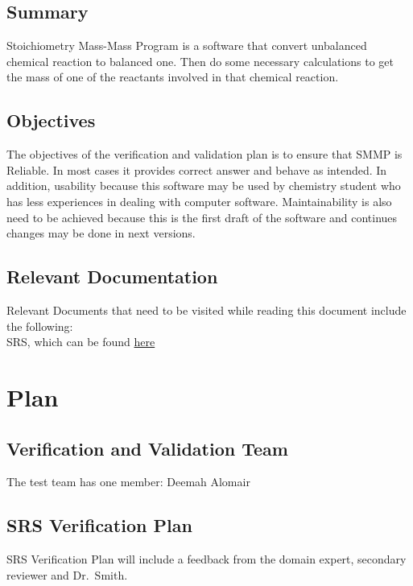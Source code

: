 \documentclass[12pt, titlepage]{article}
\begin{document}
\subsection{Summary}

Stoichiometry Mass-Mass Program is a software that convert unbalanced chemical
reaction to balanced one. Then do some necessary calculations to get the mass of
one of the reactants involved in that chemical reaction.

\subsection{Objectives}

The objectives of the verification and validation plan is to ensure that SMMP is
Reliable. In most cases it provides correct answer and behave as intended. In
addition, usability because this software may be used by chemistry student who
has less experiences in dealing with computer software. Maintainability is also
need to be achieved because this is the first draft of the software and
continues changes may be done in next versions.

\subsection{Relevant Documentation}

Relevant Documents that need to be visited while reading this document include
the following:\\

 SRS, which can be found
\href{https://github.com/deemaalomair1/CAS741_project/tree/master/docs/SRS}{here}
 
\section{Plan}
	
\subsection{Verification and Validation Team}

The test team has one member: Deemah Alomair

\subsection{SRS Verification Plan}

SRS Verification Plan will include a feedback from the domain expert, secondary
reviewer and Dr.\ Smith.
\end{document}
